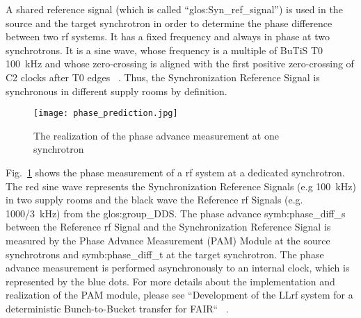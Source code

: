 A shared reference signal (which is called “\gls{glos:Syn_ref_signal}”) is used in the source and the target synchrotron in order to determine the phase difference between two rf systems. It has a fixed frequency and always in phase at two synchrotrons. It is a sine wave, whose frequency is a multiple of BuTiS T0 \SI{100}{kHz} and whose zero-crossing is aligned with the first positive zero-crossing of C2 clocks after T0 edges ~\cite{ferrand_system_2014, ferrand_system_2015}. Thus, the Synchronization Reference Signal is synchronous in different supply rooms by definition.

\begin{figure}[H]
   \centering   
   \texttt{[image: phase\_prediction.jpg]}
   \caption{The realization of the phase advance measurement at one synchrotron}
   \label{phase_prediction}
\end{figure}

Fig.~\ref{phase_prediction} shows the phase measurement of a rf system at a dedicated synchrotron. The red sine wave represents the Synchronization Reference Signals (e.g \SI{100}{kHz}) in two supply rooms and the black wave the Reference rf Signals (e.g. \SI{1000/3}{kHz}) from the \gls{glos:group_DDS}. The phase advance \gls{symb:phase_diff_s} between the Reference rf Signal and the Synchronization Reference Signal is measured by the Phase Advance Measurement (\gls{PAM}) Module at the source synchrotrons and \gls{symb:phase_diff_t} at the target synchrotron. The phase advance measurement is performed asynchronously to an internal clock, which is represented by the blue dots. For more details about the implementation and realization of the PAM module, please see ``Development of the LLrf system for a deterministic Bunch-to-Bucket transfer for FAIR`` ~\cite{ferrand_development_????}. 
